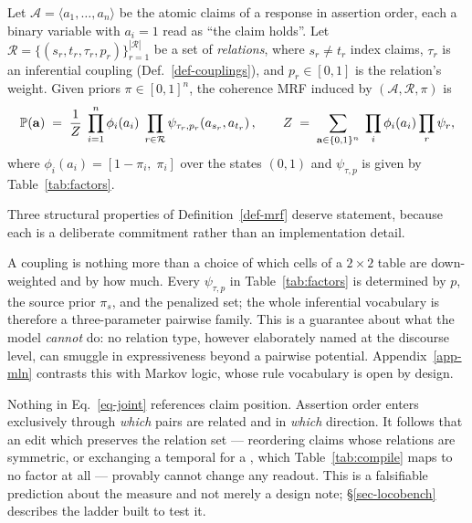 \begin{definition}
\label{def-mrf}
Let $\mathcal{A}=\langle a_1,\dots,a_n\rangle$ be the atomic claims of a response in assertion
order, each a binary variable with $a_i=1$ read as ``the claim holds''. Let
$\mathcal{R}=\{(s_r,t_r,\tau_r,p_r)\}_{r=1}^{|\mathcal{R}|}$ be a set of \emph{relations}, where
$s_r\neq t_r$ index claims, $\tau_r$ is an inferential coupling (Def.~\ref{def-couplings}), and
$p_r\in[0,1]$ is the relation's weight. Given priors $\pi\in[0,1]^n$, the coherence MRF induced by
$(\mathcal{A},\mathcal{R},\pi)$ is
\begin{equation}
\mathbb{P}\!\left( \mathbf{a} \right) \;=\; \frac{1}{Z}\;
  \prod_{i=1}^{n}\phi_i(a_i)\;
  \prod_{r\in\mathcal{R}}\psi_{\tau_r,p_r}\!\left(a_{s_r},a_{t_r}\right),
\qquad
Z \;=\; \sum_{\mathbf{a}\in\{0,1\}^n}\;\prod_{i}\phi_i(a_i)\prod_{r}\psi_r ,
\label{eq-joint}
\end{equation}
where $\phi_i(a_i)=[1-\pi_i,\;\pi_i]$ over the states $(0,1)$ and $\psi_{\tau,p}$ is given by
Table~\ref{tab:factors}.
\end{definition}

Three structural properties of Definition~\ref{def-mrf} deserve statement, because each is a
deliberate commitment rather than an implementation detail.

\begin{remark}
\label{rem-closed}
A coupling is nothing more than a choice of which cells of a $2\times2$ table are down-weighted
and by how much. Every $\psi_{\tau,p}$ in Table~\ref{tab:factors} is determined by $p$, the source
prior $\pi_s$, and the penalized set; the whole inferential vocabulary is therefore a
three-parameter pairwise family. This is a guarantee about what the model \emph{cannot} do: no
relation type, however elaborately named at the discourse level, can smuggle in expressiveness
beyond a pairwise potential. Appendix~\ref{app-mln} contrasts this with Markov logic, whose rule
vocabulary is open by design.
\end{remark}

\begin{remark}
\label{rem-order}
Nothing in Eq.~\ref{eq-joint} references claim position. Assertion order enters exclusively
through \emph{which} pairs are related and in \emph{which} direction. It follows that an edit which
preserves the relation set --- reordering claims whose relations are symmetric, or exchanging a
temporal  for a , which Table~\ref{tab:compile} maps to no
factor at all --- provably cannot change any readout. This is a falsifiable prediction about the
measure and not merely a design note; \S\ref{sec-locobench} describes the ladder built to test it.
\end{remark}

